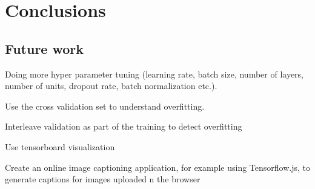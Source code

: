 \chapter{Conclusions}

\section{Future work}

Doing more hyper parameter tuning (learning rate, batch size, number of layers, number of units, dropout rate, batch normalization etc.).

Use the cross validation set to understand overfitting.

Interleave validation as part of the training to detect overfitting

Use tensorboard visualization

Create an online image captioning application, for example using Tensorflow.js, to generate captions for images uploaded n the browser
